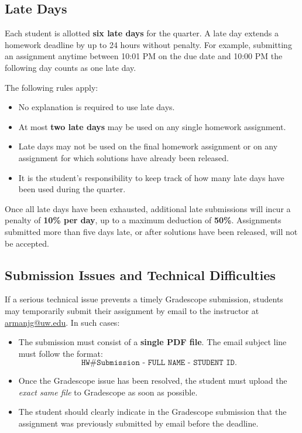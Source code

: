 \documentclass[11pt]{article}
\begin{document}
\subsection*{Late Days}

Each student is allotted \textbf{six late days} for the quarter. A late day extends a homework deadline by up to 24 hours without penalty. For example, submitting an assignment anytime between 10:01 PM on the due date and 10:00 PM the following day counts as one late day.

The following rules apply:
\begin{itemize}[leftmargin=*]
   \item No explanation is required to use late days.
   \item At most \textbf{two late days} may be used on any single homework assignment.
   \item Late days may not be used on the final homework assignment or on any assignment for which solutions have already been released.
   \item It is the student's responsibility to keep track of how many late days have been used during the quarter.
\end{itemize}

Once all late days have been exhausted, additional late submissions will incur a penalty of \textbf{10\% per day}, up to a maximum deduction of \textbf{50\%}. Assignments submitted more than five days late, or after solutions have been released, will not be accepted.

\subsection*{Submission Issues and Technical Difficulties}

If a serious technical issue prevents a timely Gradescope submission, students may temporarily submit their assignment by email to the instructor at \href{mailto:armanjg@uw.edu}{armanjg@uw.edu}. In such cases:

\begin{itemize}[leftmargin=*]
    \item The submission must consist of a \textbf{single PDF file}. The email subject line must follow the format:
    \[
    \texttt{HW\# Submission - FULL NAME - STUDENT ID}.
    \]
    \item Once the Gradescope issue has been resolved, the student must upload the \emph{exact same file} to Gradescope as soon as possible.
    \item The student should clearly indicate in the Gradescope submission that the assignment was previously submitted by email before the deadline.
\end{itemize}
\end{document}
